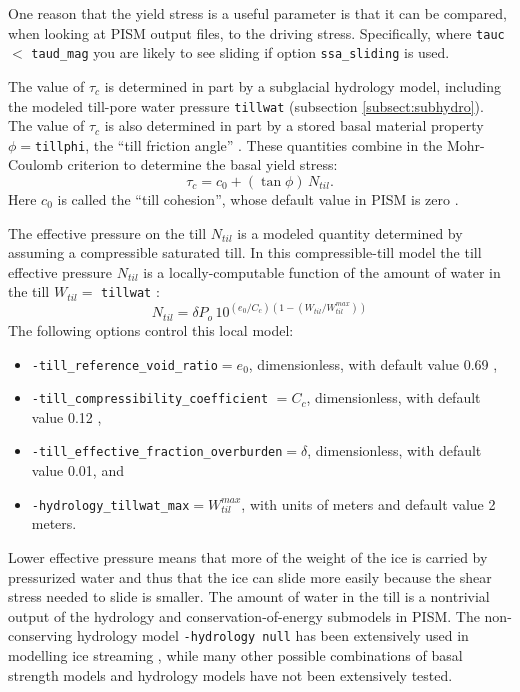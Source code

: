 One reason that the yield stress is a useful parameter is that it can be compared, when looking at PISM output files, to the driving stress.  Specifically, where \verb|tauc| $<$ \verb|taud_mag| you are likely to see sliding if option \verb|ssa_sliding| is used.

The value of $\tau_c$ is determined in part by a subglacial hydrology model, including the modeled till-pore water pressure \verb|tillwat| (subsection \ref{subsect:subhydro}).  The value of $\tau_c$ is also determined in part by a stored basal material property $\phi=$\texttt{tillphi}, the ``till friction angle'' \cite{Paterson}.  These quantities combine in the Mohr-Coulomb criterion \cite[Chapter 8]{Paterson} to determine the basal yield stress:
\begin{equation}
   \tau_c = c_{0} + (\tan\phi)\,N_{til}.  \label{eq:mohrcoulomb}
\end{equation}
Here $c_0$ is called the ``till cohesion'', whose default value in PISM is zero \cite[formula (2.4)]{SchoofStream}.

The effective pressure on the till $N_{til}$ is a modeled quantity determined by assuming a compressible saturated till.  In this compressible-till model the till effective pressure $N_{til}$ is a locally-computable function of the amount of water in the till $W_{til} =$ \verb|tillwat| \cite{BuelervanPeltDRAFT}:
\begin{equation}
N_{til} = \delta P_o \, 10^{(e_0/C_c) \left(1 - (W_{til}/W_{til}^{max})\right)}  \label{eq:computeNtil}
\end{equation}
The following options control this local model:\begin{itemize}
\item \verb|-till_reference_void_ratio|$= e_0$, dimensionless, with default value 0.69 \cite{Tulaczyketal2000b},
\item \verb|-till_compressibility_coefficient| $= C_c$, dimensionless, with default value 0.12 \cite{Tulaczyketal2000b},
\item \verb|-till_effective_fraction_overburden|$= \delta$, dimensionless, with default value 0.01, and
\item \verb|-hydrology_tillwat_max|$= W_{til}^{max}$, with units of meters and default value 2 meters.
\end{itemize}

Lower effective pressure means that more of the weight of the ice is carried by pressurized water and thus that the ice can slide more easily because the shear stress needed to slide is smaller.  The amount of water in the till is a nontrivial output of the hydrology and conservation-of-energy submodels in PISM.  The non-conserving hydrology model \verb|-hydrology null| has been extensively used in modelling ice streaming \cite{BBssasliding,BKAJS,Winkelmannetal2011}, while many other possible combinations of basal strength models and hydrology models have not been extensively tested.

